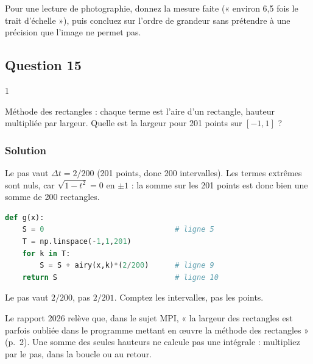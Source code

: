 \documentclass[11pt,a4paper]{article}
\begin{document}
\begin{methode}

Pour une lecture de photographie, donnez la mesure faite (« environ 6,5 fois le trait d'échelle »), puis concluez sur l'ordre de grandeur sans prétendre à une précision que l'image ne permet pas.

\end{methode}

\hypertarget{question-15}{%
\subsection{Question 15}\label{question-15}}

\begin{indication}{1}

Méthode des rectangles : chaque terme est l'aire d'un rectangle, hauteur multipliée par largeur. Quelle est la largeur pour 201 points sur \([-1,1]\) ?

\end{indication}

\hypertarget{solution-14}{%
\subsubsection{Solution}\label{solution-14}}

Le pas vaut \(\Delta t=2/200\) (201 points, donc 200 intervalles). Les termes extrêmes sont nuls, car \(\sqrt{1-t^2}=0\) en \(\pm1\) : la somme sur les 201 points est donc bien une somme de 200 rectangles.

\begin{lstlisting}[language=Python]
def g(x):
    S = 0                              # ligne 5
    T = np.linspace(-1,1,201)
    for k in T:
        S = S + airy(x,k)*(2/200)      # ligne 9
    return S                           # ligne 10
\end{lstlisting}

\begin{piege}

Le pas vaut \(2/200\), pas \(2/201\). Comptez les intervalles, pas les points.

\end{piege}

\begin{jury}

Le rapport 2026 relève que, dans le sujet MPI, « la largeur des rectangles est parfois oubliée dans le programme mettant en œuvre la méthode des rectangles » (p.~2). Une somme des seules hauteurs ne calcule pas une intégrale : multipliez par le pas, dans la boucle ou au retour.

\end{jury}
\end{document}
